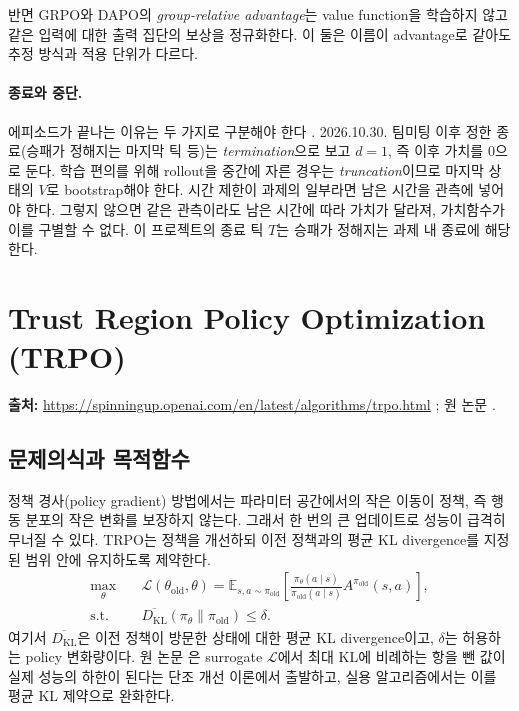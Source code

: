 \documentclass[11pt,a4paper]{article}
\newcommand{\E}{\mathbb{E}}
\newcommand{\KL}{D_{\mathrm{KL}}}
\begin{document}
반면 GRPO와 DAPO의 \emph{group-relative advantage}는 value function을 학습하지 않고 같은 입력에 대한 출력 집단의 보상을 정규화한다. 이 둘은 이름이 advantage로 같아도 추정 방식과 적용 단위가 다르다.

\paragraph{종료와 중단.} 에피소드가 끝나는 이유는 두 가지로 구분해야 한다 \cite{timelimits}. 2026.10.30. 팀미팅 이후 정한 종료(승패가 정해지는 마지막 틱 등)는 \emph{termination}으로 보고 \(d=1\), 즉 이후 가치를 0으로 둔다. 학습 편의를 위해 rollout을 중간에 자른 경우는 \emph{truncation}이므로 마지막 상태의 \(V\)로 bootstrap해야 한다. 시간 제한이 과제의 일부라면 남은 시간을 관측에 넣어야 한다. 그렇지 않으면 같은 관측이라도 남은 시간에 따라 가치가 달라져, 가치함수가 이를 구별할 수 없다. 이 프로젝트의 종료 틱 \(T\)는 승패가 정해지는 과제 내 종료에 해당한다.

\section{Trust Region Policy Optimization (TRPO)}\label{sec:trpo}
\noindent\textbf{출처:} \url{https://spinningup.openai.com/en/latest/algorithms/trpo.html} \cite{spin-trpo}; 원 논문 \cite{trpo}.

\subsection{문제의식과 목적함수}
정책 경사(policy gradient) 방법에서는 파라미터 공간에서의 작은 이동이 정책, 즉 행동 분포의 작은 변화를 보장하지 않는다. 그래서 한 번의 큰 업데이트로 성능이 급격히 무너질 수 있다. TRPO는 정책을 개선하되 이전 정책과의 평균 KL divergence를 지정된 범위 안에 유지하도록 제약한다.
\begin{align}
 \max_\theta\quad &\mathcal L(\theta_{\mathrm{old}},\theta)
 =\E_{s,a\sim\pi_{\mathrm{old}}}
 \left[\frac{\pi_\theta(a\mid s)}{\pi_{\mathrm{old}}(a\mid s)}A^{\pi_{\mathrm{old}}}(s,a)\right],\\
 \text{s.t.}\quad&\overline{\KL}(\pi_\theta\|\pi_{\mathrm{old}})\le\delta.
\end{align}
여기서 \(\overline{\KL}\)은 이전 정책이 방문한 상태에 대한 평균 KL divergence이고, \(\delta\)는 허용하는 policy 변화량이다. 원 논문 \cite{trpo}은 surrogate \(\mathcal L\)에서 최대 KL에 비례하는 항을 뺀 값이 실제 성능의 하한이 된다는 단조 개선 이론에서 출발하고, 실용 알고리즘에서는 이를 평균 KL 제약으로 완화한다.
\end{document}
